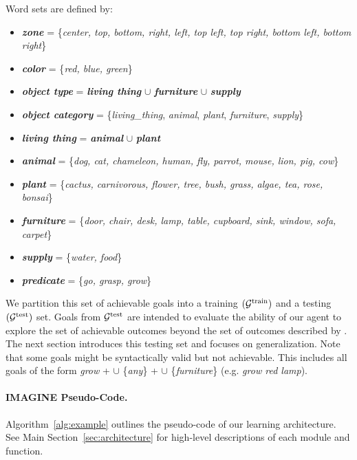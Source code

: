 Word sets are defined by:
\begin{itemize}[noitemsep]
    \item \textbf{\textit{zone}} = \{\textit{center, top, bottom, right, left, top left, top right, bottom left, bottom right}\}
    \item \textbf{\textit{color}} = \{\textit{red, blue, green}\} 
    \item  \textbf{\textit{object type}} = \textbf{\textit{living thing}}  $\cup$ \textbf{\textit{furniture}}  $\cup$ \textbf{\textit{supply}}
    \item  \textbf{\textit{object category}} = \{\textit{living\_thing}, \textit{animal}, \textit{plant}, \textit{furniture}, \textit{supply}\}
     \item  \textbf{\textit{living thing}} = \textbf{\textit{animal}} $\cup$ \textbf{\textit{plant}}
    \item \textbf{\textit{animal}} = \{\textit{dog, cat, chameleon, human, fly, parrot, mouse, lion, pig, cow}\}
    \item \textbf{\textit{plant}} = \{\textit{cactus, carnivorous, flower, tree, bush, grass, algae, tea, rose, bonsai}\}
    \item \textbf{\textit{furniture}} = \{\textit{door, chair, desk, lamp, table, cupboard, sink, window, sofa, carpet}\} 
    \item \textbf{\textit{supply}} = \{\textit{water, food}\}
    \item \textbf{\textit{predicate}} = \{\textit{go, grasp, grow}\}
\end{itemize}
We partition this set of achievable goals into a training $(\mathcal{G}^{\text{train}})$ and a testing $(\mathcal{G}^{\text{test}})$ set. Goals from $\mathcal{G}^{\text{test}}$ are intended to evaluate the ability of our agent to explore the set of achievable outcomes beyond the set of outcomes described by \SP. The next section introduces this testing set and focuses on generalization. Note that some goals might be syntactically valid but not achievable. This includes all goals of the form \textit{grow} +  $\cup$ \{\textit{any}\} +  $\cup$ \{\textit{furniture}\} (e.g. \textit{grow red lamp}).

\paragraph{IMAGINE Pseudo-Code.}
Algorithm~\ref{alg:example} outlines the pseudo-code of our learning architecture. See Main Section~\ref{sec:architecture} for high-level descriptions of each module and function.

